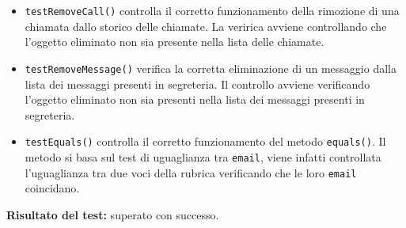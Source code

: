 \begin{itemize}
\begin{itemize}
\item \texttt{testRemoveCall()} controlla il corretto funzionamento della rimozione di una chiamata dallo storico delle chiamate. La veririca avviene controllando che l'oggetto eliminato non sia presente nella lista delle chiamate.

\item \texttt{testRemoveMessage()} verifica la corretta eliminazione di un messaggio dalla lista dei messaggi presenti in segreteria.
Il controllo avviene verificando l'oggetto eliminato non sia presenti nella lista dei messaggi presenti in segreteria. 

\item \texttt{testEquals()} controlla  il corretto funzionamento del metodo \texttt{equals()}. Il metodo si basa sul test di uguaglianza tra \texttt{email}, viene infatti controllata l'uguaglianza tra due voci della rubrica verificando che le loro \texttt{email} coincidano. 

\end{itemize}
\textbf{Risultato del test:} superato con successo.
\end{itemize}

